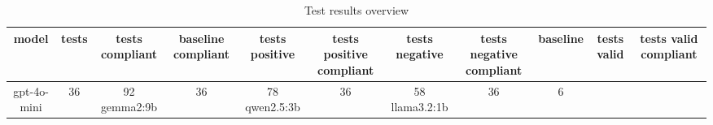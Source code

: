 
  \begin{table}[h!]
  \centering
  \begin{tabular}{|c|c|c|c|c|c|c|c|c|c|c|}
  \hline
  model & tests & tests compliant & baseline compliant & tests positive & tests positive compliant & tests negative & tests negative compliant & baseline & tests valid & tests valid compliant \\
  \hline
  gpt-4o-mini & 36 & 92%
\hline
gemma2:9b & 36 & 78%
\hline
qwen2.5:3b & 36 & 58%
\hline
llama3.2:1b & 36 & 6%
  \end{tabular}
  \caption{Test results overview}
  
  \end{table}
  